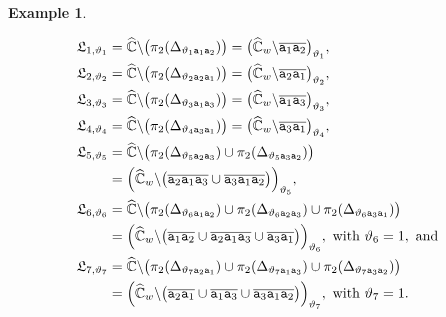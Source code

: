\documentclass[final,3p,times]{elsarticle}
\newcommand{\CW}{\ensuremath{{\widehat{\mathbb C}}}}
\theoremstyle{definition}
\newtheorem{example}{Example}[section]
\begin{document}
\begin{example}
\begin{enumerate}[label=\alph*),leftmargin=*]
\begin{align*}
\mathfrak{L}_{1,\vartheta_1} &= \CW\backslash \big( \pi_2 (\Delta_{\vartheta_1 {\tt a}_1 {\tt a}_2}  ) \big)
= \big( \CW_w \backslash  \overline{{\tt a}_1 {\tt a}_2} \big)_{\vartheta_1},
\\
%
\mathfrak{L}_{2,\vartheta_2} &= \CW\backslash \big( \pi_2 (\Delta_{\vartheta_2 {\tt a}_2 {\tt a}_1} ) \big)
= \big( \CW_w \backslash  \overline{{\tt a}_2 {\tt a}_1} \big)_{\vartheta_2},
\\
%
\mathfrak{L}_{3,\vartheta_3} &= \CW\backslash \big( \pi_2 (\Delta_{\vartheta_3 {\tt a}_1 {\tt a}_3} ) \big)
= \big( \CW_w \backslash  \overline{{\tt a}_1 {\tt a}_3} \big)_{\vartheta_3},
\\
%
\mathfrak{L}_{4,\vartheta_4} &= \CW\backslash \big( \pi_2 (\Delta_{\vartheta_4 {\tt a}_3 {\tt a}_1} ) \big)
= \big( \CW_w \backslash  \overline{{\tt a}_3 {\tt a}_1} \big)_{\vartheta_4}, 
\\
%
\mathfrak{L}_{5,\vartheta_5} &= \CW\backslash \big( 
\pi_2 (\Delta_{\vartheta_5 {\tt a}_2 {\tt a}_3} ) \cup
\pi_2 (\Delta_{\vartheta_5 {\tt a}_3 {\tt a}_2} )
\big) 
\\
&= \Big( \CW_w \backslash \big( 
\overline{{\tt a}_2 {\tt a}_1 {\tt a}_3} \cup
\overline{{\tt a}_3 {\tt a}_1 {\tt a}_2}
\big)
\Big)_{\vartheta_5},
\\
%
\mathfrak{L}_{6,\vartheta_6} &= \CW\backslash \big( 
\pi_2 (\Delta_{\vartheta_6 {\tt a}_1 {\tt a}_2} ) \cup 
\pi_2 (\Delta_{\vartheta_6 {\tt a}_2 {\tt a}_3} ) \cup
\pi_2 (\Delta_{\vartheta_6 {\tt a}_3 {\tt a}_1} ) 
\big)
\\
&= \Big( \CW_w \backslash  \big(
\overline{{\tt a}_1 {\tt a}_2} \cup
\overline{{\tt a}_2 {\tt a}_1 {\tt a}_3} \cup
\overline{{\tt a}_3 {\tt a}_1} 
\big)
\Big)_{\vartheta_6},  \text{ with } \vartheta_6=1, \text{ and }
\\
%
\mathfrak{L}_{7,\vartheta_7} &= \CW\backslash \big( 
\pi_2 (\Delta_{\vartheta_7 {\tt a}_2 {\tt a}_1} ) \cup 
\pi_2 (\Delta_{\vartheta_7 {\tt a}_1 {\tt a}_3} ) \cup
\pi_2 (\Delta_{\vartheta_7 {\tt a}_3 {\tt a}_2} ) 
\big)
\\
&= \Big( \CW_w \backslash  \big(
\overline{{\tt a}_2 {\tt a}_1} \cup
\overline{{\tt a}_1 {\tt a}_3} \cup
\overline{{\tt a}_3 {\tt a}_1 {\tt a}_2 } 
\big)
\Big)_{\vartheta_7}, \text{ with } \vartheta_7=1.
\end{align*}


\end{enumerate}
\end{example}
\end{document}
